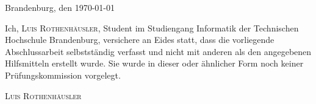 \thispagestyle{empty}

\large
\begin{flushright}
  Brandenburg, den \today
\end{flushright}

\vspace*{50mm}
Ich, {\scshape Luis Rothenhäusler}, Student im Studiengang Informatik der Technischen Hochschule Brandenburg, versichere an Eides statt, dass die vorliegende Abschlussarbeit selbstständig verfasst und nicht mit anderen als den
angegebenen Hilfsmitteln erstellt wurde.
Sie wurde in dieser oder ähnlicher Form noch keiner Prüfungskommission vorgelegt.

\vspace*{50mm}

\begin{flushright}
  {\scshape Luis Rothenhäusler}
\end{flushright}

\normalsize